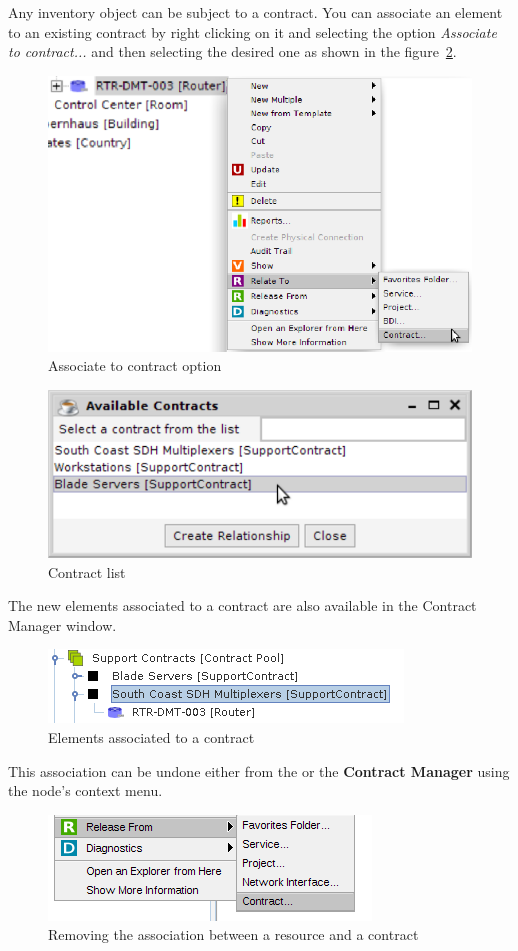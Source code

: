 \documentclass[a4paper]{article}
\begin{document}
		Any inventory object can be subject to a contract. You can associate an element to an existing contract by right clicking on it and selecting the option \textit{Associate to contract...} and then selecting the desired one as shown in the figure~\ref{fig:contract_manager_contract_list}.
		\begin{figure}[h!]
			\centering
			\includegraphics[width=0.8\linewidth]{img/contract_manager_associate_option.png}
			\caption{Associate to contract option}
			\label{fig:contract_manager_associate_option}
		\end{figure}		
		\newline
		\begin{figure}[h!]
			\centering
			\includegraphics[width=0.4\linewidth]{img/contract_manager_contract_list.png}
			\caption{Contract list}
			\label{fig:contract_manager_contract_list}
		\end{figure}
		
		The new elements associated to a contract are also available in the Contract Manager window.
		\begin{figure}[h!]
			\centering
			\includegraphics[width=0.4\linewidth]{img/contract_manager_elements.png}
			\caption{Elements associated to a contract}
			\label{fig:contract_manager_elements}
		\end{figure}
		
		\newpage
		This association can be undone either from the \textbf{} or the \textbf{Contract Manager} using the node's context menu.
		\begin{figure}[h!]
			\centering
			\includegraphics[width=0.6\linewidth]{img/contract_manager_release_from_contract.png}
			\caption{Removing the association between a resource and a contract}
			\label{fig:contract_manager_release_from_contract}
		\end{figure}
		
\end{document}
